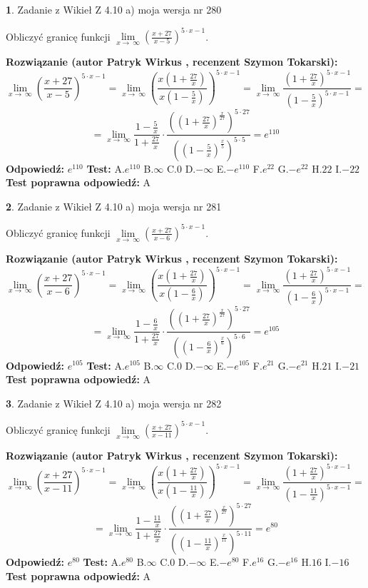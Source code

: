 \documentclass[12pt, a4paper]{article}
\theoremstyle{definition} %
\newtheorem{zad}{}
\newcommand{\zadStart}[1]{\begin{zad}#1\newline}
\newcommand{\zadStop}{\end{zad}}
\newcommand{\rozwStart}[2]{\noindent \textbf{Rozwiązanie (autor #1 , recenzent #2): }\newline}
\newcommand{\rozwStop}{\newline}
\newcommand{\odpStart}{\noindent \textbf{Odpowiedź:}\newline}
\newcommand{\odpStop}{\newline}
\newcommand{\testStart}{\noindent \textbf{Test:}\newline}
\newcommand{\testStop}{\newline}
\newcommand{\kluczStart}{\noindent \textbf{Test poprawna odpowiedź:}\newline}
\newcommand{\kluczStop}{\newline}
\begin{document}
\zadStart{Zadanie z Wikieł Z 4.10 a) moja wersja nr 280}

Obliczyć granicę funkcji  $\lim\limits_{x\to\ \infty}(\frac{x+27}{x-5})^{5\cdot x-1}$.
\zadStop
\rozwStart{Patryk Wirkus}{Szymon Tokarski}
$$\lim\limits_{x\to\ \infty}(\frac{x+27}{x-5})^{5\cdot x-1} = \lim\limits_{x\to\ \infty}(\frac{x(1+\frac{27}{x})}{x(1-\frac{5}{x})})^{5\cdot x-1}=\lim\limits_{x\to\ \infty}\frac{(1+\frac{27}{x})^{5\cdot x-1}}{(1-\frac{5}{x})^{5\cdot x-1}}=$$
$$=\lim\limits_{x\to\ \infty}\frac{1-\frac{5}{x}}{1+\frac{27}{x}}\cdot\frac{((1+\frac{27}{x})^{\frac{x}{27}})^{5\cdot27}}{((1-\frac{5}{x})^{\frac{x}{5}})^{5\cdot5}}=e^{110}$$
\rozwStop
\odpStart
$e^{110}$
\odpStop
\testStart
A.$e^{110}$ B.$\infty$ C.$0$ D.$-\infty$ E.$-e^{110}$
F.$e^{22}$ G.$-e^{22}$
H.$22$
I.$-22$
\testStop
\kluczStart
A
\kluczStop



\zadStart{Zadanie z Wikieł Z 4.10 a) moja wersja nr 281}

Obliczyć granicę funkcji  $\lim\limits_{x\to\ \infty}(\frac{x+27}{x-6})^{5\cdot x-1}$.
\zadStop
\rozwStart{Patryk Wirkus}{Szymon Tokarski}
$$\lim\limits_{x\to\ \infty}(\frac{x+27}{x-6})^{5\cdot x-1} = \lim\limits_{x\to\ \infty}(\frac{x(1+\frac{27}{x})}{x(1-\frac{6}{x})})^{5\cdot x-1}=\lim\limits_{x\to\ \infty}\frac{(1+\frac{27}{x})^{5\cdot x-1}}{(1-\frac{6}{x})^{5\cdot x-1}}=$$
$$=\lim\limits_{x\to\ \infty}\frac{1-\frac{6}{x}}{1+\frac{27}{x}}\cdot\frac{((1+\frac{27}{x})^{\frac{x}{27}})^{5\cdot27}}{((1-\frac{6}{x})^{\frac{x}{6}})^{5\cdot6}}=e^{105}$$
\rozwStop
\odpStart
$e^{105}$
\odpStop
\testStart
A.$e^{105}$ B.$\infty$ C.$0$ D.$-\infty$ E.$-e^{105}$
F.$e^{21}$ G.$-e^{21}$
H.$21$
I.$-21$
\testStop
\kluczStart
A
\kluczStop



\zadStart{Zadanie z Wikieł Z 4.10 a) moja wersja nr 282}

Obliczyć granicę funkcji  $\lim\limits_{x\to\ \infty}(\frac{x+27}{x-11})^{5\cdot x-1}$.
\zadStop
\rozwStart{Patryk Wirkus}{Szymon Tokarski}
$$\lim\limits_{x\to\ \infty}(\frac{x+27}{x-11})^{5\cdot x-1} = \lim\limits_{x\to\ \infty}(\frac{x(1+\frac{27}{x})}{x(1-\frac{11}{x})})^{5\cdot x-1}=\lim\limits_{x\to\ \infty}\frac{(1+\frac{27}{x})^{5\cdot x-1}}{(1-\frac{11}{x})^{5\cdot x-1}}=$$
$$=\lim\limits_{x\to\ \infty}\frac{1-\frac{11}{x}}{1+\frac{27}{x}}\cdot\frac{((1+\frac{27}{x})^{\frac{x}{27}})^{5\cdot27}}{((1-\frac{11}{x})^{\frac{x}{11}})^{5\cdot11}}=e^{80}$$
\rozwStop
\odpStart
$e^{80}$
\odpStop
\testStart
A.$e^{80}$ B.$\infty$ C.$0$ D.$-\infty$ E.$-e^{80}$
F.$e^{16}$ G.$-e^{16}$
H.$16$
I.$-16$
\testStop
\kluczStart
A
\kluczStop
\end{document}
